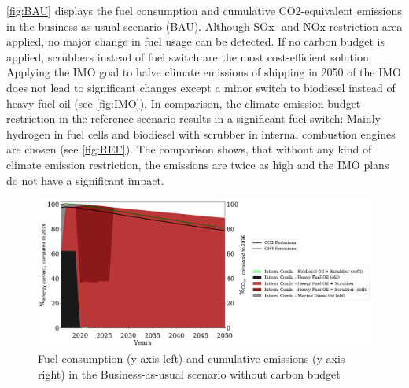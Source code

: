 \documentclass[article]{elsarticle}
\begin{document}

\autoref{fig:BAU} displays the fuel consumption and cumulative CO2-equivalent emissions in the business as usual scenario (BAU). Although SOx- and NOx-restriction area applied, no major change in fuel usage can be detected. If no carbon budget is applied, scrubbers instead of fuel switch are the most cost-efficient solution. Applying the IMO goal to halve climate emissions of shipping in 2050 of the IMO does not lead to significant changes except a minor switch to biodiesel instead of heavy fuel oil (see \autoref{fig:IMO}). In comparison, the climate emission budget restriction in the reference scenario  results in a significant fuel switch: Mainly hydrogen in fuel cells and biodiesel with scrubber in internal combustion engines are chosen (see \autoref{fig:REF}). The comparison shows, that without any kind of climate emission restriction, the emissions are twice as high and the IMO plans do not have a significant impact. 

\begin{figure}[htb]
    \centering
    \includegraphics[width=\textwidth]{figures/BAU_fuels_emissions.pdf}
    \caption{Fuel consumption (y-axis left) and cumulative emissions (y-axis right) in the Business-as-usual scenario without carbon budget}
    \label{fig:BAU}
\end{figure}
\end{document}
